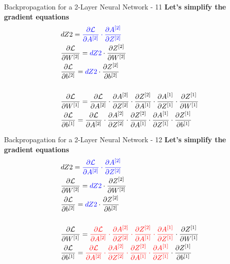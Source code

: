\documentclass[aspectratio=169]{beamer}
\begin{document}
%
%
\begin{frame}{Backpropagation for a 2-Layer Neural Network - 11}
\textbf{Let's simplify the gradient equations}
\begin{align*}
&dZ2 = \textcolor{blue}{\frac{\partial \mathcal{L}}{\partial A^{[2]}} \cdot \frac{\partial A^{[2]}}{\partial Z^{[2]}}} 
\\
&\frac{\partial \mathcal{L}}{\partial W^{[2]}} = \textcolor{blue}{dZ2} \cdot\frac{\partial Z^{[2]}}{\partial W^{[2]}}
\\
&\frac{\partial \mathcal{L}}{\partial b^{[2]}} = \textcolor{blue}{dZ2} \cdot \frac{\partial Z^{[2]}}{\partial b^{[2]}}
\\
&\\
&\frac{\partial \mathcal{L}}{\partial W^{[1]}} = \frac{\partial \mathcal{L}}{\partial A^{[2]}} \cdot \frac{\partial A^{[2]}}{\partial Z^{[2]}} \cdot \frac{\partial Z^{[2]}}{\partial A^{[1]}} \cdot \frac{\partial A^{[1]}}{\partial Z^{[1]}} \cdot \frac{\partial Z^{[1]}}{\partial W^{[1]}}
\\
&\frac{\partial \mathcal{L}}{\partial b^{[1]}} = \frac{\partial \mathcal{L}}{\partial A^{[2]}} \cdot \frac{\partial A^{[2]}}{\partial Z^{[2]}} \cdot \frac{\partial Z^{[2]}}{\partial A^{[1]}} \cdot \frac{\partial A^{[1]}}{\partial Z^{[1]}} \cdot \frac{\partial Z^{[1]}}{\partial b^{[1]}}
\end{align*}
\end{frame}
%
%
\begin{frame}{Backpropagation for a 2-Layer Neural Network - 12}
\textbf{Let's simplify the gradient equations}
\begin{align*}
&dZ2 = \textcolor{blue}{\frac{\partial \mathcal{L}}{\partial A^{[2]}} \cdot \frac{\partial A^{[2]}}{\partial Z^{[2]}}} 
\\
&\frac{\partial \mathcal{L}}{\partial W^{[2]}} = \textcolor{blue}{dZ2} \cdot\frac{\partial Z^{[2]}}{\partial W^{[2]}}
\\
&\frac{\partial \mathcal{L}}{\partial b^{[2]}} = \textcolor{blue}{dZ2} \cdot \frac{\partial Z^{[2]}}{\partial b^{[2]}}
\\
&\\
&\frac{\partial \mathcal{L}}{\partial W^{[1]}} = \textcolor{red}{\frac{\partial \mathcal{L}}{\partial A^{[2]}} \cdot \frac{\partial A^{[2]}}{\partial Z^{[2]}} \cdot \frac{\partial Z^{[2]}}{\partial A^{[1]}} \cdot \frac{\partial A^{[1]}}{\partial Z^{[1]}}} \cdot \frac{\partial Z^{[1]}}{\partial W^{[1]}}
\\
&\frac{\partial \mathcal{L}}{\partial b^{[1]}} = \textcolor{red}{\frac{\partial \mathcal{L}}{\partial A^{[2]}} \cdot \frac{\partial A^{[2]}}{\partial Z^{[2]}} \cdot \frac{\partial Z^{[2]}}{\partial A^{[1]}} \cdot \frac{\partial A^{[1]}}{\partial Z^{[1]}}} \cdot \frac{\partial Z^{[1]}}{\partial b^{[1]}}
\end{align*}
\end{frame}
\end{document}
